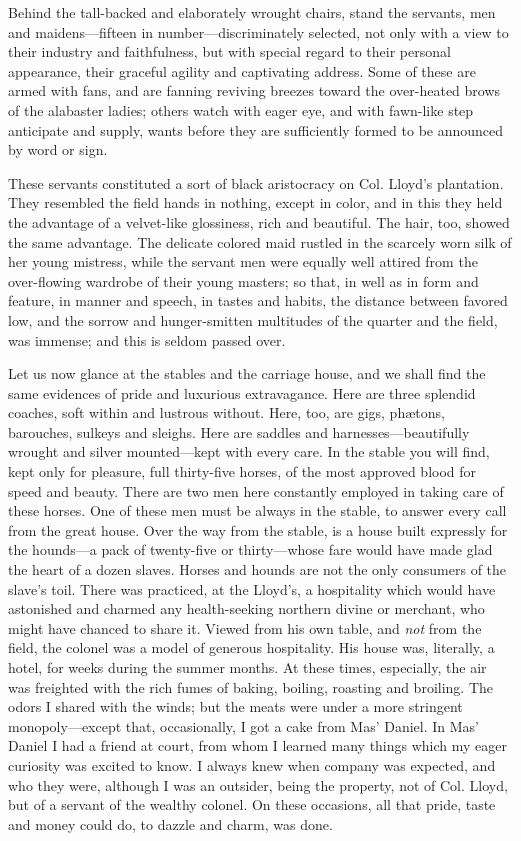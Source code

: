 Behind the tall-backed and elaborately wrought chairs, stand the
servants, men and maidens---fifteen in number---discriminately selected,
not only with a view to their industry and faithfulness, but with
special regard to their personal appearance, their graceful agility and
captivating address. Some of these are armed with fans, and are fanning
reviving breezes toward the over-heated brows of the alabaster ladies;
others watch with eager eye, and with fawn-like step anticipate and
supply, wants before they are sufficiently formed to be announced by
word or sign.

These servants constituted a sort of black aristocracy on Col. Lloyd's
plantation. They resembled the field hands in nothing, except in color,
and in this they held the advantage of a velvet-like glossiness, rich
and beautiful. The hair, too, showed the same advantage. The delicate
colored maid rustled in the scarcely worn silk of her young mistress,
while the servant men were equally well attired from the over-flowing
wardrobe of their young masters; so that, in well as in form and
feature, in manner and speech, in tastes and habits, the distance
between favored low, and the sorrow and hunger-smitten
{\protect\hypertarget{110}{}{}}multitudes of the quarter and the field,
was immense; and this is seldom passed over.

Let us now glance at the stables and the carriage house, and we shall
find the same evidences of pride and luxurious extravagance. Here are
three splendid coaches, soft within and lustrous without. Here, too, are
gigs, phætons, barouches, sulkeys and sleighs. Here are saddles and
harnesses---beautifully wrought and silver mounted---kept with every
care. In the stable you will find, kept only for pleasure, full
thirty-five horses, of the most approved blood for speed and beauty.
There are two men here constantly employed in taking care of these
horses. One of these men must be always in the stable, to answer every
call from the great house. Over the way from the stable, is a house
built expressly for the hounds---a pack of twenty-five or thirty---whose
fare would have made glad the heart of a dozen slaves. Horses and hounds
are not the only consumers of the slave's toil. There was practiced, at
the Lloyd's, a hospitality which would have astonished and charmed any
health-seeking northern divine or merchant, who might have chanced to
share it. Viewed from his own table, and \emph{not} from the field, the
colonel was a model of generous hospitality. His house was, literally, a
hotel, for weeks during the summer months. At these times, especially,
the air was freighted with the rich fumes of baking, boiling, roasting
and broiling. The odors I shared with the winds; but the meats were
under a more stringent monopoly---except that, occasionally, I got a
cake from Mas' Daniel. In Mas' Daniel I had a friend at court, from whom
I learned many things {\protect\hypertarget{111}{}{}}which my eager
curiosity was excited to know. I always knew when company was expected,
and who they were, although I was an outsider, being the property, not
of Col. Lloyd, but of a servant of the wealthy colonel. On these
occasions, all that pride, taste and money could do, to dazzle and
charm, was done.

